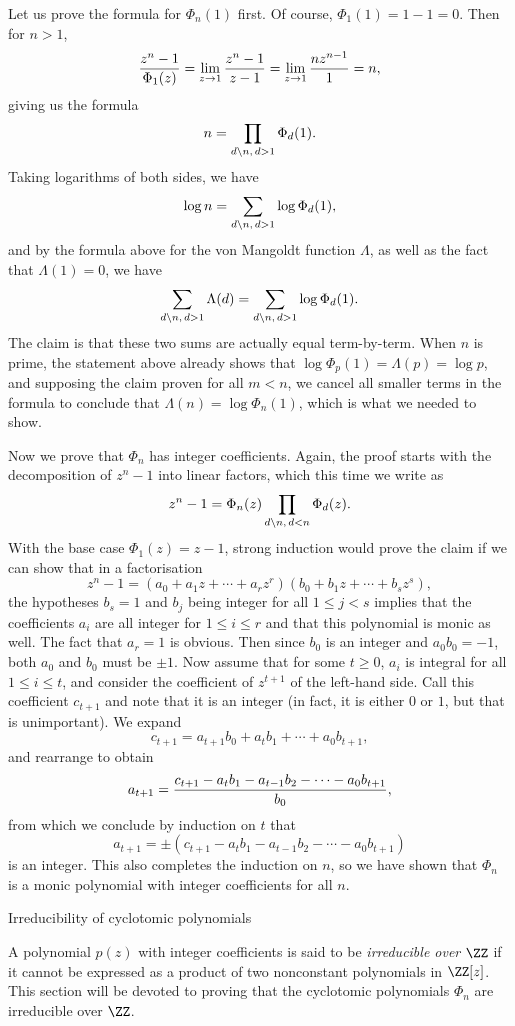 Let us prove the formula for $\Phi_n(1)$ first. Of course, $\Phi_1(1) = 1-1 = 0$. Then for $n>1$,
$${z^n-1\over \Phi_1(z)} = \lim_{z\to 1} {z^n-1 \over z-1} = \lim_{z\to 1} {nz^{n-1} \over 1} = n,$$
giving us the formula
$$ n = \prod_{d\backslash n,\,d>1} \Phi_d(1) .$$
Taking logarithms of both sides, we have
$$\log n = \sum_{d\backslash n,\,d>1} \log \Phi_d(1),$$
and by the formula above for the von Mangoldt function $\Lambda$, as well as the fact that $\Lambda(1) = 0$,
we have
$$\sum_{d\backslash n,\,d>1} \Lambda(d) = \sum_{d\backslash n,\,d>1} \log \Phi_d(1).$$
The claim is that these two sums are actually equal term-by-term. When $n$ is prime, the statement above
already shows that $\log \Phi_p(1) = \Lambda(p) = \log p$,
and supposing the claim proven for all $m<n$, we cancel all smaller terms in the formula
to conclude that $\Lambda(n) = \log\Phi_n(1)$, which is what we needed to show.

Now we prove that $\Phi_n$ has integer coefficients. Again, the proof starts with the decomposition
of $z^n-1$ into linear factors, which this time we write as
$$z^n - 1 = \Phi_n(z) \prod_{d\backslash n,\, d<n} \Phi_d(z).$$
With the base case $\Phi_1(z) = z-1$, strong induction would prove the claim if we can show that in a factorisation
$$z^n-1 = (a_0 + a_1z + \cdots + a_rz^r) (b_0 + b_1z + \cdots + b_sz^s),$$
the hypotheses $b_s = 1$ and $b_j$ being integer for all $1\le j< s$ implies that the coefficients $a_i$
are all integer for $1\le i\le r$ and that this polynomial is monic as well. The fact that $a_r = 1$ is
obvious. Then since $b_0$ is an integer and $a_0b_0 = -1$, both $a_0$ and $b_0$
must be $\pm 1$. Now assume that for some $t\ge 0$, $a_i$ is integral for all $1\le i\le t$, and consider
the coefficient of $z^{t+1}$ of the left-hand side. Call this coefficient $c_{t+1}$ and note that it is
an integer (in fact, it is either $0$ or $1$, but that is unimportant). We expand
$$c_{t+1} = a_{t+1} b_{0} + a_t b_1 + \cdots + a_0 b_{t+1},$$
and rearrange to obtain
$$a_{t+1} = {c_{t+1} - a_t b_1 - a_{t-1} b_2 - \cdots - a_0 b_{t+1}\over b_0},$$
from which we conclude by induction on $t$ that
$$a_{t+1} = \pm (c_{t+1} - a_t b_1 - a_{t-1} b_2 - \cdots - a_0 b_{t+1})$$
is an integer. This also completes the induction on $n$, so we have shown that $\Phi_n$ is a monic polynomial
with integer coefficients for all $n$.

\advsect Irreducibility of cyclotomic polynomials

A polynomial $p(z)$ with integer coefficients is said to be {\it irreducible over $\ZZ$} if it cannot be expressed
as a product of two nonconstant polynomials in $\ZZ[z]$. This section will be devoted to proving that
the cyclotomic polynomials $\Phi_n$ are irreducible over $\ZZ$.

